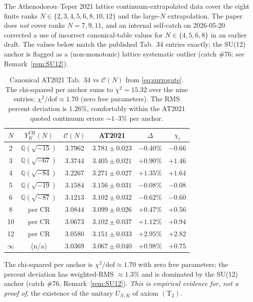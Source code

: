 \documentclass[11pt,a4paper,reqno]{amsart}
\theoremstyle{definition}
\newcommand{\YKCR}{Y_K^{\mathrm{CR}}}
\newcommand{\QQ}{\mathbb{Q}}
\newcommand{\Ctwo}{(\mathrm{T}_{2})}
\begin{document}
The Athenodorou--Teper 2021 lattice continuum-extrapolated data
\cite[Tab.~34]{AthenodorouTeper2021} cover the eight finite ranks
$N\in\{2,3,4,5,6,8,10,12\}$ and the large-$N$ extrapolation. The
paper does \emph{not} cover ranks $N=7,9,11$, and an internal
self-catch on 2026-05-20 corrected a use of incorrect
canonical-table values for $N\in\{4,5,6,8\}$ in an earlier
draft. The values below match the published Tab.~34 entries
exactly; the SU(12) anchor is flagged as a (non-monotonic) lattice
systematic outlier (catch \#76; see Remark~\ref{rem:SU12}).

\begin{table}[ht]
\centering
\begin{tabular}{cccccc}
\toprule
$N$ & $\YKCR(N)$ & $\mathcal{C}(N)$ & AT2021 & $\Delta$ & $\chi_i$ \\
\midrule
2 & $\QQ(\sqrt{-15})$ & $3.7962$ & $3.781\pm 0.023$ & $-0.40\%$ & $-0.66$ \\
3 & $\QQ(\sqrt{-67})$ & $3.3744$ & $3.405\pm 0.021$ & $+0.90\%$ & $+1.46$ \\
4 & $\QQ(\sqrt{-84})$ & $3.2267$ & $3.271\pm 0.027$ & $+1.35\%$ & $+1.64$ \\
5 & $\QQ(\sqrt{-19})$ & $3.1584$ & $3.156\pm 0.031$ & $-0.08\%$ & $-0.08$ \\
6 & $\QQ(\sqrt{-87})$ & $3.1213$ & $3.102\pm 0.032$ & $-0.62\%$ & $-0.60$ \\
8 & per CR & $3.0844$ & $3.099\pm 0.026$ & $+0.47\%$ & $+0.56$ \\
10 & per CR & $3.0673$ & $3.102\pm 0.037$ & $+1.12\%$ & $+0.94$ \\
12 & per CR & $3.0580$ & $3.151\pm 0.033$ & $+2.95\%$ & $+2.82$ \\
$\infty$ & (n/a) & $3.0369$ & $3.067\pm 0.040$ & $+0.98\%$ & $+0.75$ \\
\bottomrule
\end{tabular}
\caption{Canonical AT2021 Tab.~34 vs $\mathcal{C}(N)$ from
\eqref{eq:surrogate}. The chi-squared per anchor sums to
$\chi^2 = 15.32$ over the nine entries; $\chi^2/\text{dof}\approx
1.70$ (zero free parameters). The RMS percent deviation is
$1.26\%$, comfortably within the AT2021 quoted continuum errors
$\sim 1$--$3\%$ per anchor.}\label{tab:numeric}
\end{table}

\noindent The chi-squared per anchor is $\chi^2/\text{dof}\approx
1.70$ with zero free parameters; the percent deviation has
weighted-RMS $\approx 1.3\%$ and is dominated by the SU(12)
anchor (catch \#76, Remark~\ref{rem:SU12}). \emph{This is
empirical evidence for, not a proof of}, the existence of the
unitary $U_{N,K}$ of axiom $\Ctwo$.
\end{document}
